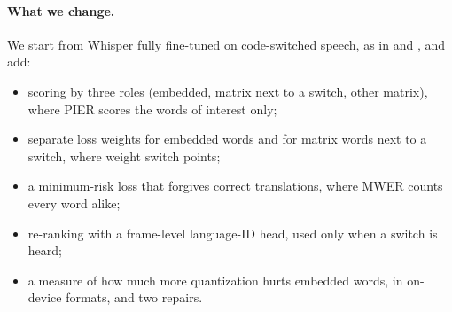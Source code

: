\paragraph{What we change.}
We start from Whisper fully fine-tuned on code-switched speech, as in \citet{yang2024adapting} and \citet{zhou2025csdialogue}, and add:
\begin{itemize}
  \item scoring by three roles (embedded, matrix next to a switch, other matrix), where PIER scores the words of interest only;
  \item separate loss weights for embedded words and for matrix words next to a switch, where \citet{ugan2025adapting} weight switch points;
  \item a minimum-risk loss that forgives correct translations, where MWER counts every word alike;
  \item re-ranking with a frame-level language-ID head, used only when a switch is heard;
  \item a measure of how much more quantization hurts embedded words, in on-device formats, and two repairs.
\end{itemize}
